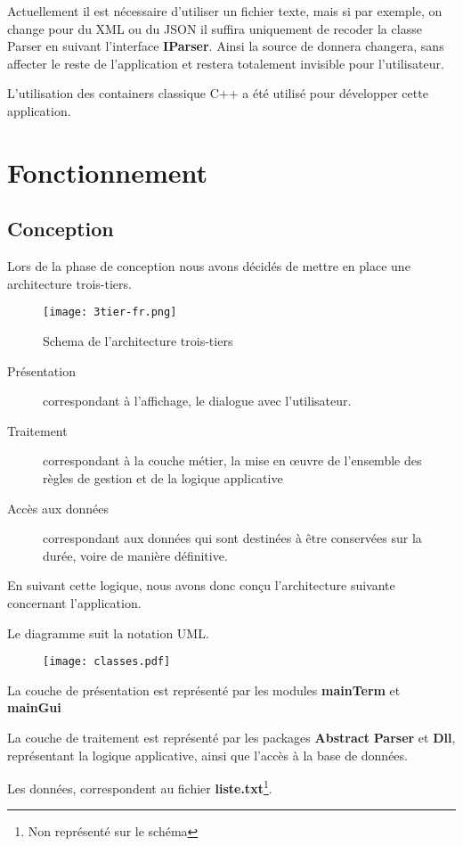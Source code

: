 \documentclass[12pt,a4paper]{report}
\begin{document}
Actuellement il est nécessaire d'utiliser un fichier texte, mais si par exemple, on change pour du XML ou du JSON il suffira uniquement de recoder la classe Parser en suivant l'interface \textbf{IParser}.
Ainsi la source de donnera changera, sans affecter le reste de l'application et restera totalement invisible pour l'utilisateur. 




L'utilisation des containers classique C++ a été utilisé pour développer cette application. 

\section{Fonctionnement}
\subsection*{Conception}
Lors de la phase de conception nous avons décidés de mettre en place une architecture trois-tiers. 
\begin{figure}[h]
	\centering
	\texttt{[image: 3tier-fr.png]}
	\caption{Schema de l'architecture trois-tiers}
\end{figure}

\begin{description}
	\item[Présentation] correspondant à l'affichage, le dialogue avec l'utilisateur. 
	\item[Traitement] correspondant à la couche métier, la mise en œuvre de l'ensemble des règles de gestion et de la logique applicative
	\item[Accès aux données] correspondant aux données qui sont destinées à être conservées sur la durée, voire de manière définitive.
\end{description}

En suivant cette logique, nous avons donc conçu l'architecture suivante concernant l'application. 

Le diagramme suit la notation UML. 
\begin{figure}[H]
	\texttt{[image: classes.pdf]}
\end{figure}
\newpage
\begin{description}
	\item La couche de présentation est représenté par les modules \textbf{mainTerm} et \textbf{mainGui}
	\item La couche de traitement est représenté par les packages \textbf{Abstract} \textbf{Parser} et \textbf{Dll}, représentant la logique applicative, ainsi que l'accès à la base de données. 
	\item Les données, correspondent au fichier \textbf{liste.txt}\footnote{Non représenté sur le schéma}.
\end{description}
\end{document}
